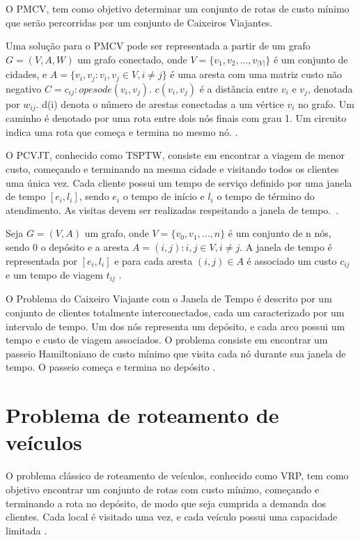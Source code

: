 O \ac{PMCV}, tem como objetivo determinar um conjunto de rotas de custo mínimo que serão percorridas por um conjunto de Caixeiros Viajantes.

Uma solução para o \ac{PMCV} pode ser representada a partir de um grafo $G = (V,A,W)$ um grafo conectado, onde $V = \{v_1, v_2, ..., v_{|V|}\}$ é um conjunto de cidades, e $A = \{ v_i,v_j: v_i,v_j \in V, i \neq j\}$ é uma aresta com uma matriz custo não negativo $C = {c_{ij}: o peso de (v_i,v_j)}$. $c(v_i, v_j)$ é a distância entre $v_i$ e $v_j$, denotada por $w_{ij}$. d(i) denota o número de arestas conectadas a um vértice $v_i$ no grafo. Um caminho é denotado por uma rota entre dois nós finais com grau 1. Um circuito indica uma rota que começa e termina no mesmo nó. 
\cite{meng:2012}. 

O \ac{PCVJT}, conhecido como \ac{TSPTW}, consiste em encontrar a viagem de menor custo, começando e terminando na mesma cidade e visitando todos os clientes uma única vez. Cada cliente possui um tempo de serviço definido por uma janela de tempo $[e_{i}, l_{i}]$, sendo $e_{i}$ o tempo de início e $l_{i}$ o tempo de término do atendimento. As visitas devem ser realizadas respeitando a janela de tempo.~\cite{urrutia:2010}.  

Seja $G=(V,A)$ um grafo, onde $V = \{v_0, v_1, ..., n \}$ é um conjunto de n nós, sendo $0$ o depósito e a aresta $A = {(i,j): i,j \in V, i \neq j}$. A janela de tempo é representada por $[e_i, l_i]$ e para cada aresta $(i,j) \in A$ é associado um custo $c_{ij}$ e um tempo de viagem $t_{ij}$ \cite{calvo:2000}.

O Problema do Caixeiro Viajante com o Janela de Tempo é descrito por um conjunto de clientes totalmente interconectados, cada um caracterizado por um intervalo de tempo. Um dos nós representa um depósito, e cada arco possui um tempo e custo de viagem associados. O problema consiste em encontrar um passeio Hamiltoniano de custo mínimo que visita cada nó durante sua janela de tempo. O passeio começa e termina no depósito \cite{calvo:2000}.

\section{Problema de roteamento de veículos}

O problema clássico de roteamento de veículos, conhecido como \ac{VRP}, tem como objetivo encontrar um conjunto de rotas com custo mínimo, começando e terminando a rota no depósito, de modo que seja cumprida a demanda dos clientes. Cada local é visitado uma vez, e cada veículo possui uma capacidade limitada \cite{gold:2008}.

